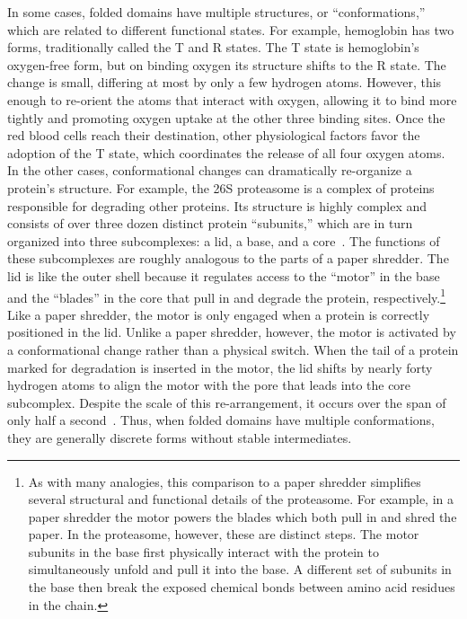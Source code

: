 In some cases, folded domains have multiple structures, or ``conformations,'' which are related to different functional states. For example, hemoglobin has two forms, traditionally called the T and R states. The T state is hemoglobin's oxygen-free form, but on binding oxygen its structure shifts to the R state. The change is small, differing at most by only a few hydrogen atoms. However, this enough to re-orient the atoms that interact with oxygen, allowing it to bind more tightly and promoting oxygen uptake at the other three binding sites. Once the red blood cells reach their destination, other physiological factors favor the adoption of the T state, which coordinates the release of all four oxygen atoms. In the other cases, conformational changes can dramatically re-organize a protein's structure. For example, the 26S proteasome is a complex of proteins responsible for degrading other proteins. Its structure is highly complex and consists of over three dozen distinct protein ``subunits,'' which are in turn organized into three subcomplexes: a lid, a base, and a core~\cite{Finley2016, Bard2018}. The functions of these subcomplexes are roughly analogous to the parts of a paper shredder. The lid is like the outer shell because it regulates access to the ``motor'' in the base and the ``blades'' in the core that pull in and degrade the protein, respectively.\footnote{As with many analogies, this comparison to a paper shredder simplifies several structural and functional details of the proteasome. For example, in a paper shredder the motor powers the blades which both pull in and shred the paper. In the proteasome, however, these are distinct steps. The motor subunits in the base first physically interact with the protein to simultaneously unfold and pull it into the base. A different set of subunits in the base then break the exposed chemical bonds between amino acid residues in the chain.} Like a paper shredder, the motor is only engaged when a protein is correctly positioned in the lid. Unlike a paper shredder, however, the motor is activated by a conformational change rather than a physical switch. When the tail of a protein marked for degradation is inserted in the motor, the lid shifts by nearly forty hydrogen atoms to align the motor with the pore that leads into the core subcomplex. Despite the scale of this re-arrangement, it occurs over the span of only half a second~\cite{Bard2019}. Thus, when folded domains have multiple conformations, they are generally discrete forms without stable intermediates.

